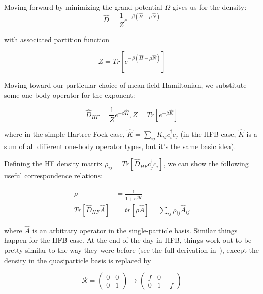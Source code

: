 Moving forward by minimizing the grand potential $\Omega$ gives us for the density:
\begin{equation}
\hat{D} = \frac{1}{Z}e^{-\beta\left(\hat{H}-\mu\hat{N}\right)}
\end{equation}

\noindent with associated partition function

\begin{equation}
Z = Tr\left[e^{-\beta\left(\hat{H}-\mu\hat{N}\right)}\right]
\end{equation}

Moving toward our particular choice of mean-field Hamiltonian, we substitute some one-body operator for the exponent:

\begin{equation}
\hat{D}_{HF} = \frac{1}{Z}e^{-\beta\hat{K}}, Z = Tr\left[e^{-\beta\hat{K}}\right]
\end{equation}

\noindent where in the simple Hartree-Fock case, $\hat{K} = \sum_{ij}K_{ij}c_i^\dagger c_j$ (in the HFB case, $\hat{K}$ is a sum of all different one-body operator types, but it's the same basic idea).

Defining the HF density matrix $\rho_{ij}=Tr\left[\hat{D}_{HF}c_j^\dagger c_i\right]$, we can show the following useful correspondence relations:

\begin{align}
\rho &= \frac{1}{1+e^{\beta\hat{K}}} \\
Tr\left[\hat{D}_{HF}\hat{A}\right] &= tr\left[\rho\hat{A}\right] = \sum_{ij}\rho_{ij}\hat{A}_{ij}
\end{align}

\noindent where $\hat{A}$ is an arbitrary operator in the single-particle basis. Similar things happen for the HFB case. At the end of the day in HFB, things work out to be pretty similar to the way they were before (see the full derivation in~\cite{Goodman1981}), except the density in the quasiparticle basis is replaced by

\begin{equation}
\mathcal{R} =
\left(\begin{array}{cc}
0 & 0 \\
0 & 1
\end{array}\right)
\rightarrow
\left(\begin{array}{cc}
f & 0 \\
0 & 1-f
\end{array}\right)
\end{equation}

